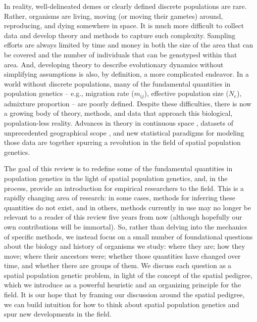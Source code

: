 \documentclass{ar-1col}
\begin{document}
In reality, well-delineated demes or clearly defined discrete populations are rare.
Rather, organisms are living,
moving (or moving their gametes) around,
reproducing, and dying somewhere in space.
It is much more difficult to collect data and develop theory and methods
to capture such complexity.
Sampling efforts are always limited by time and money
in both the size of the area that can be covered
and the number of individuals that can be genotyped within that area.
And, developing theory to describe evolutionary dynamics
without simplifying assumptions is also,
by definition,
a more complicated endeavor.
In a world without discrete populations, 
many of the fundamental quantities in population genetics -- 
e.g., migration rate ($m_{ij}$), 
effective population size ($N_e$),
admixture proportion
--
are poorly defined.
Despite these difficulties,
there is now a growing body of theory, methods, and data
that approach this biological, population-less reality.
Advances in theory in continuous space 
\citep{felsenstein1975pain,BartonWilson1995,barton-depaulis-etheridge, barton2010modelling, barton2010newmodel, Barton2013},
datasets of unprecedented geographical scope 
\citep[e.g.,][]{POBI, Aguillon2017deconstructing, Shaffer195743},
and new statistical paradigms for modeling those data 
\citep{petkova2016visualizing, ringbauer2017inferring, ringbauer2018estimating, conStruct, alasadi2018estimating}
are together spurring a revolution in the field of spatial population genetics.

The goal of this review
is to redefine some of the fundamental quantities in population genetics 
in the light of spatial population genetics, 
and, in the process, provide an introduction for empirical researchers
to the field.
This is a rapidly changing area of research:
in some cases, methods for inferring these quantities do not exist, 
and in others, 
methods currently in use may no longer be relevant
to a reader of this review five years from now
(although hopefully our own contributions will be immortal).
So, rather than delving into the mechanics of specific methods,
we instead focus on a small number of foundational questions 
about the biology and history of organisms we study:
where they are; how they move; where their ancestors were;
whether those quantities have changed over time, 
and whether there are groups of them.
We discuss each question
as a spatial population genetic problem, 
in light of the concept of the spatial pedigree,
which we introduce as a powerful heuristic
and an organizing principle for the field.
It is our hope that by framing our discussion around the spatial pedigree, 
we can build intuition for how to think about spatial population genetics 
and spur new developments in the field.
\end{document}
